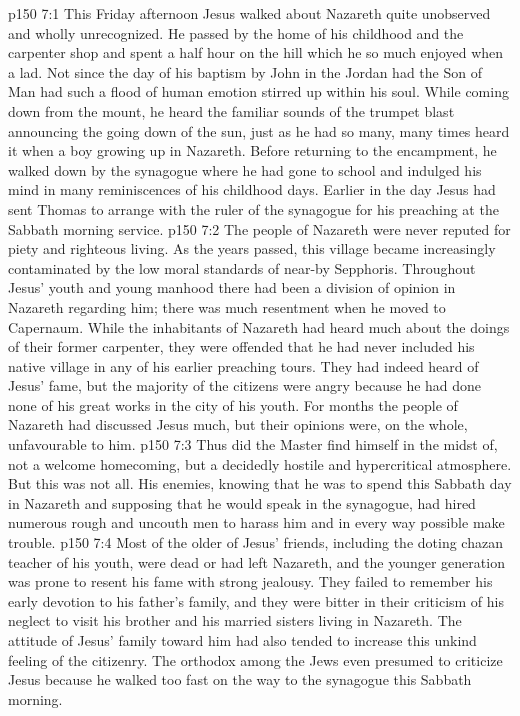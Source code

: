 \vs p150 7:1 This Friday afternoon Jesus walked about Nazareth quite unobserved and wholly unrecognized. He passed by the home of his childhood and the carpenter shop and spent a half hour on the hill which he so much enjoyed when a lad. Not since the day of his baptism by John in the Jordan had the Son of Man had such a flood of human emotion stirred up within his soul. While coming down from the mount, he heard the familiar sounds of the trumpet blast announcing the going down of the sun, just as he had so many, many times heard it when a boy growing up in Nazareth. Before returning to the encampment, he walked down by the synagogue where he had gone to school and indulged his mind in many reminiscences of his childhood days. Earlier in the day Jesus had sent Thomas to arrange with the ruler of the synagogue for his preaching at the Sabbath morning service.
\vs p150 7:2 The people of Nazareth were never reputed for piety and righteous living. As the years passed, this village became increasingly contaminated by the low moral standards of near-by Sepphoris. Throughout Jesus’ youth and young manhood there had been a division of opinion in Nazareth regarding him; there was much resentment when he moved to Capernaum. While the inhabitants of Nazareth had heard much about the doings of their former carpenter, they were offended that he had never included his native village in any of his earlier preaching tours. They had indeed heard of Jesus’ fame, but the majority of the citizens were angry because he had done none of his great works in the city of his youth. For months the people of Nazareth had discussed Jesus much, but their opinions were, on the whole, unfavourable to him.
\vs p150 7:3 Thus did the Master find himself in the midst of, not a welcome homecoming, but a decidedly hostile and hypercritical atmosphere. But this was not all. His enemies, knowing that he was to spend this Sabbath day in Nazareth and supposing that he would speak in the synagogue, had hired numerous rough and uncouth men to harass him and in every way possible make trouble.
\vs p150 7:4 Most of the older of Jesus’ friends, including the doting chazan teacher of his youth, were dead or had left Nazareth, and the younger generation was prone to resent his fame with strong jealousy. They failed to remember his early devotion to his father’s family, and they were bitter in their criticism of his neglect to visit his brother and his married sisters living in Nazareth. The attitude of Jesus’ family toward him had also tended to increase this unkind feeling of the citizenry. The orthodox among the Jews even presumed to criticize Jesus because he walked too fast on the way to the synagogue this Sabbath morning.
